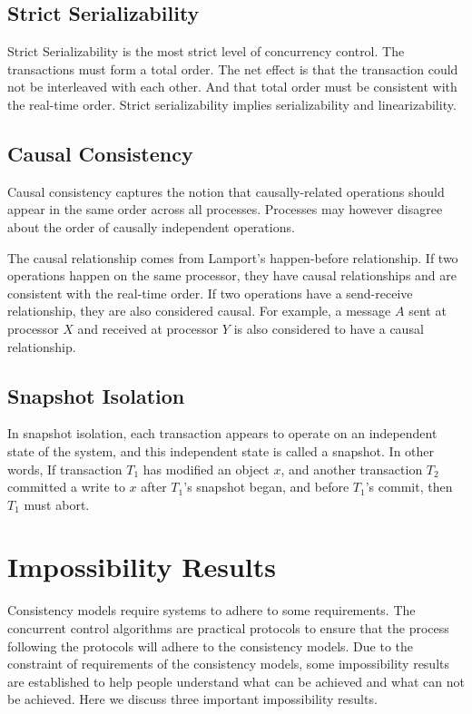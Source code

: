 \subsection{Strict Serializability}
Strict Serializability is the most strict level of concurrency control. The transactions must form a total order. The net effect is that the transaction could not be interleaved with each other. And that total order must be consistent with the real-time order. Strict serializability implies serializability and linearizability. 
\subsection{Causal Consistency}
Causal consistency captures the notion that causally-related operations should appear in the same order across all processes. Processes may however disagree about the order of causally independent operations.

The causal relationship comes from Lamport's happen-before relationship. If two operations happen on the same processor, they have causal relationships and are consistent with the real-time order. If two operations have a send-receive relationship, they are also considered causal. For example, a message $A$ sent at processor $X$ and received at processor $Y$ is also considered to have a causal relationship.






\subsection{Snapshot Isolation}
In snapshot isolation, each transaction appears to operate on an independent state of the system, and this independent state is called a snapshot. In other words, If transaction $T_1$ has modified an object $x$, and another transaction $T_2$ committed a write to $x$ after $T_1$’s snapshot began, and before $T_1$’s commit, then $T_1$ must abort. 
\section{Impossibility Results}
Consistency models require systems to adhere to some requirements. The concurrent control algorithms are practical protocols to ensure that the process following the protocols will adhere to the consistency models. Due to the constraint of requirements of the consistency models, some impossibility results are established to help people understand what can be achieved and what can not be achieved. Here we discuss three important impossibility results. 
